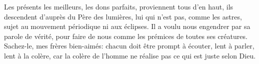 Les présents les meilleurs, les dons parfaits, proviennent tous d’en haut,
	ils descendent d’auprès du Père des lumières,
	lui qui n’est pas, comme les astres, sujet au mouvement périodique ni aux éclipses.
Il a voulu nous engendrer par sa parole de vérité,
	pour faire de nous comme les prémices de toutes ses créatures.
Sachez-le, mes frères bien-aimés:
	chacun doit être prompt à écouter, lent à parler, lent à la colère,
	car la colère de l’homme ne réalise pas ce qui est juste selon Dieu.
